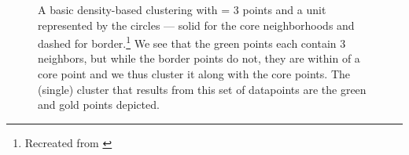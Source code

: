 \begin{figure}
\captionsetup[subfigure]{width=\textwidth}
\centering
    
    \vspace{12pt}
\caption{A basic density-based clustering with \minneigh{} = 3 points and a unit \eps{} represented by the circles --- solid for the core neighborhoods and dashed for border.\protect\footnote{Recreated from \cite{johnson2015density}}
We see that the green points each contain 3 neighbors, but while the border points do not, they are within \eps{} of a core point and we thus cluster it along with the core points.
The (single) cluster that results from this set of datapoints are the green and gold points depicted.
}
\label{fig:density-based-clustering}
\end{figure}